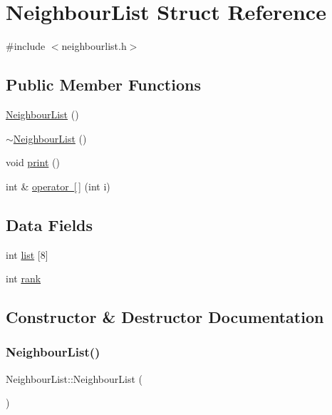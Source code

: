 \hypertarget{struct_neighbour_list}{}\section{Neighbour\+List Struct Reference}
\label{struct_neighbour_list}


{\ttfamily \#include $<$neighbourlist.\+h$>$}

\subsection*{Public Member Functions}
\begin{DoxyCompactItemize}
\item 
\mbox{\hyperlink{struct_neighbour_list_ab376c095d360ea03b0e499a8820bd0e7}{Neighbour\+List}} ()
\item 
\mbox{\hyperlink{struct_neighbour_list_afcdbcc7fde83d4ce3a4fecc8d4105cd8}{$\sim$\+Neighbour\+List}} ()
\item 
void \mbox{\hyperlink{struct_neighbour_list_a9e8123deded59c4c702429fda52af140}{print}} ()
\item 
int \& \mbox{\hyperlink{struct_neighbour_list_a9bd6ad04ef1eb6ad9737ac493b6864d1}{operator \mbox{[}$\,$\mbox{]}}} (int i)
\end{DoxyCompactItemize}
\subsection*{Data Fields}
\begin{DoxyCompactItemize}
\item 
int \mbox{\hyperlink{struct_neighbour_list_ad55e922aabd4ef75711d22c5e5634165}{list}} \mbox{[}8\mbox{]}
\item 
int \mbox{\hyperlink{struct_neighbour_list_abe10231f4cd3e607e19cea0b0d7aab03}{rank}}
\end{DoxyCompactItemize}


\subsection{Constructor \& Destructor Documentation}
\mbox{\label{struct_neighbour_list_ab376c095d360ea03b0e499a8820bd0e7}} 
\subsubsection{\texorpdfstring{NeighbourList()}{NeighbourList()}}
{\footnotesize\ttfamily Neighbour\+List\+::\+Neighbour\+List (\begin{DoxyParamCaption}{ }\end{DoxyParamCaption})}


